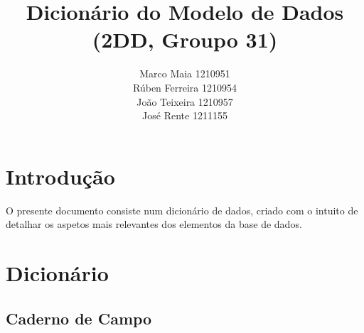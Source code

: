 \documentclass[12pt, a4paper]{article}
\title{Dicion\'ario do Modelo de Dados (2DD, Groupo 31)}
\author{
    Marco Maia          {\textemdash}    1210951\\
    R\'uben Ferreira    {\textemdash}    1210954\\
    Jo\~{a}o Teixeira   {\textemdash}    1210957\\
    Jos\'e Rente        {\textemdash}    1211155\\
}
\begin{document}
\makeatletter
{}
\makeatother
\thispagestyle{empty}
\newpage

{
    \hypersetup{hidelinks}
    \tableofcontents
    \printindex
    \newpage
}

\section{Introdu\c{c}\~ao}\label{sc:intro}

O presente documento consiste num dicion\'ario de dados, criado com o intuito de detalhar os aspetos mais relevantes dos elementos da base de dados.



\section{Dicion\'ario}\label{sc:dict}


\subsection{Caderno de Campo}\label{ssc:cad_campo}
\end{document}
